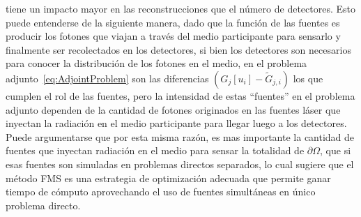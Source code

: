 tiene un impacto 
mayor en las reconstrucciones que el número de detectores. 
Esto puede entenderse de la siguiente manera, dado que la función de las fuentes 
es producir los fotones que viajan a través del medio participante para sensarlo 
y finalmente ser recolectados en los detectores, si bien los detectores son necesarios 
para conocer la distribución de los fotones en el medio, en el problema adjunto~\eqref{eq:AdjointProblem} 
son las diferencias $(G_j[u_i]-\widetilde{G}_{j,i})$ los que cumplen el rol de las fuentes, 
pero la intensidad de estas ``fuentes'' en el problema adjunto dependen de la cantidad 
de fotones originados en las fuentes láser que inyectan la radiación en el medio participante 
para llegar luego a los detectores. Puede argumentarse que por esta misma razón, 
es mas importante la cantidad de fuentes que inyectan radiación en el medio para sensar 
la totalidad de $\partial \Omega$, que si esas fuentes son simuladas en problemas 
directos separados, lo cual sugiere que el método FMS es una estrategia 
de optimización adecuada que permite ganar tiempo de cómputo aprovechando 
el uso de fuentes simultáneas en único problema directo.

